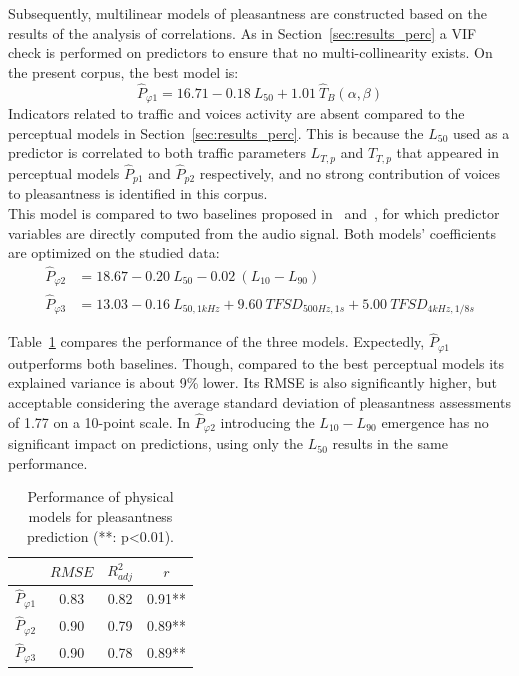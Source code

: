 \documentclass[11pt,a4paper]{article}
\begin{document}
Subsequently, multilinear models of pleasantness are constructed based on the results of the analysis of correlations. As in Section~\ref{sec:results_perc} a VIF check is performed on predictors to ensure that no multi-collinearity exists. On the present corpus, the best model is:
\begin{equation}
\hat P_{\varphi 1} = 16.71 - 0.18~L_{50} + 1.01~\hat T_B(\alpha, \beta)
\end{equation}
Indicators related to traffic and voices activity are absent compared to the perceptual models in Section~\ref{sec:results_perc}. This is because the $L_{50}$ used as a predictor is correlated to both traffic parameters $L_{T, p}$ and $T_{T, p}$ that appeared in perceptual models $\hat P_{p1}$ and $\hat P_{p2}$ respectively, and no strong contribution of voices to pleasantness is identified in this corpus.\\

This model is compared to two baselines proposed in~\cite{ricciardi2014} and~\cite{aumond2017}, for which predictor variables are directly computed from the audio signal. Both models' coefficients are optimized on the studied data:
\begin{align}
\hat P_{\varphi 2} &= 18.67 - 0.20~L_{50} - 0.02~(L_{10}-L_{90})\\
\hat P_{\varphi 3} &= 13.03 - 0.16~L_{50, 1kHz} + 9.60~TFSD_{500Hz, 1s} + 5.00~TFSD_{4kHz, 1/8s}
\end{align}

Table~\ref{tab:physm} compares the performance of the three models. Expectedly, $\hat P_{\varphi 1}$ outperforms both baselines. Though, compared to the best perceptual models its explained variance is about 9\% lower. Its RMSE is also significantly higher, but acceptable considering the average standard deviation of pleasantness assessments of 1.77 on a 10-point scale. In $\hat P_{\varphi 2}$ introducing the $L_{10}-L_{90}$ emergence has no significant impact on predictions, using only the $L_{50}$ results in the same performance.\\

\begin{table}[t]
\centering
\caption{Performance of physical models for pleasantness prediction (**: p<0.01).}
\label{tab:physm}
\begin{tabular}{ c | c | c | c }
\hline
	 & $RMSE$ & $R^2_{adj}$ & $r$ \\ \hline
	$\hat P_{\varphi 1}$ & 0.83 & 0.82 & 0.91** \\
	$\hat P_{\varphi 2}$ & 0.90 & 0.79 & 0.89** \\
	$\hat P_{\varphi 3}$ & 0.90 & 0.78 & 0.89** \\ \hline
\end{tabular}
\end{table}
\end{document}
